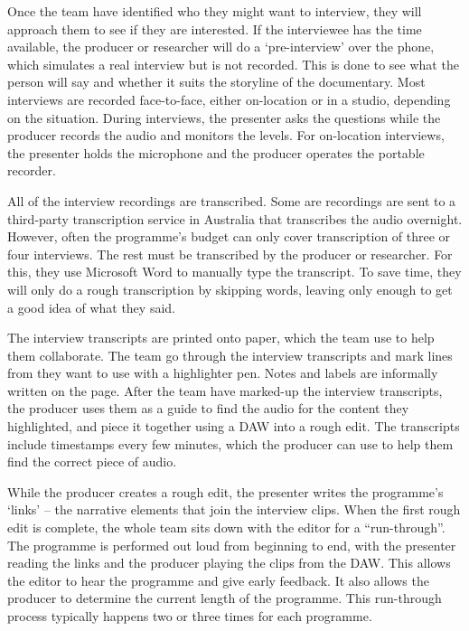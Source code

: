 Once the team have identified who they might want to interview, they will approach them to see if they are interested.
If the interviewee has the time available, the producer or researcher will do a `pre-interview' over the phone, which
simulates a real interview but is not recorded. This is done to see what the person will say and whether it suits the
storyline of the documentary.  Most interviews are recorded face-to-face, either on-location or in a studio, depending
on the situation.  During interviews, the presenter asks the questions while the producer records the audio and
monitors the levels.  For on-location interviews, the presenter holds the microphone and the producer operates the
portable recorder.

All of the interview recordings are transcribed. Some are recordings are sent to a third-party transcription service in
Australia that transcribes the audio overnight.  However, often the programme's budget can only cover transcription of
three or four interviews. The rest must be transcribed by the producer or researcher. For this, they use Microsoft Word
to manually type the transcript.  To save time, they will only do a rough transcription by skipping words, leaving only
enough to get a good idea of what they said.

The interview transcripts are printed onto paper, which the team use to help them collaborate.  The team go through the
interview transcripts and mark lines from they want to use with a highlighter pen. Notes and labels are informally
written on the page.  After the team have marked-up the interview transcripts, the producer uses them as a guide to
find the audio for the content they highlighted, and piece it together using a DAW into a rough edit. The transcripts
include timestamps every few minutes, which the producer can use to help them find the correct piece of audio.

While the producer creates a rough edit, the presenter writes the programme's `links' -- the narrative elements that
join the interview clips. When the first rough edit is complete, the whole team sits down with the editor for a
``run-through''. The programme is performed out loud from beginning to end, with the presenter reading the links and
the producer playing the clips from the DAW. This allows the editor to hear the programme and give early feedback. It
also allows the producer to determine the current length of the programme.  This run-through process typically happens
two or three times for each programme.

